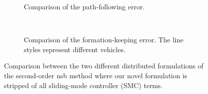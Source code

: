 \begin{figure}[hb]
    \centering
    \begin{subfigure}[t]{.9\textwidth}
    \centering
    \setlength{}
    \setlength\figureheight{3.2cm}
    
    \caption{Comparison of the path-following error.}
    \label{fig:second_order_comparison_path_no_smc}
    \end{subfigure}
    \\
    \begin{subfigure}[t]{.9\textwidth}
    \centering
    \setlength{}
    \setlength\figureheight{3.2cm}
    
    \caption{Comparison of the formation-keeping error. The line styles represent different vehicles.}
    \label{fig:second_order_comparison_formation_no_smc}
    \end{subfigure}
    \caption{Comparison between the two different distributed formulations of the second-order \gls{nsb} method where our novel formulation is stripped of all sliding-mode controller (SMC) terms.}
    \label{fig:second_order_comparison_no_smc}
\end{figure}